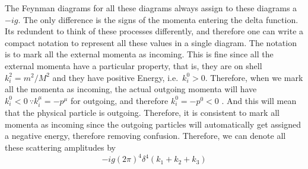 \documentclass[11pt]{article}
\numberwithin{equation}{section}
\begin{document}
    The Feynman diagrams for all these diagrams always assign to these diagrams a \(-ig\). The only difference is the signs of the momenta entering the delta function. Its redundent to think of these processes differently, and therefore one can write a compact notation to represent all these values in a single diagram. The notation is to mark all the external momenta as incoming. This is fine since all the external momenta have a particular property, that is, they are on shell \(k_i^2 = m^2/M^2\) and they have positive Energy, i.e.\ \(k_i^0 > 0\). Therefore, when we mark all the momenta as incoming, the actual outgoing momenta will have \(k_i^0<0~\because k_i^\mu = -p^\mu\) for outgoing, and therefore \(k_i^0 = -p^0 < 0\) . And this will mean that the physical particle is outgoing. Therefore, it is consistent to mark all momenta as incoming since the outgoing particles will automatically get assigned a negative energy, therefore removing confusion. Therefore, we can denote all these scattering amplitudes by 
    \begin{equation*}
        -ig(2\pi)^4\delta^4(k_1 + k_2 + k_3)
    \end{equation*}
\end{document}
